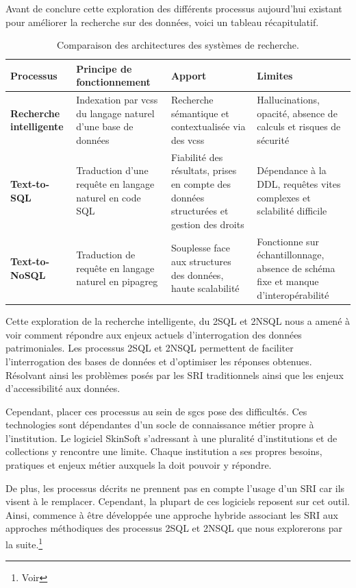Avant de conclure cette exploration des différents processus aujourd'hui existant pour améliorer la recherche sur des données, voici un tableau récapitulatif.

\begin{table}[H]
\centering
\small
\begin{tabularx}{\textwidth}{>{\bfseries}l X X X}
\toprule
Processus & Principe de fonctionnement & Apport & Limites \\
\midrule
Recherche intelligente & Indexation par \glspl{vcs} du langage naturel d'une base de données & Recherche sémantique et contextualisée via des \glspl{vcs} & Hallucinations, opacité, absence de calculs et risques de sécurité \\
\addlinespace[1cm]
Text-to-SQL & Traduction d'une requête en langage naturel en code SQL & Fiabilité des résultats, prises en compte des données structurées et gestion des droits & Dépendance à la \gls{DDL}, requêtes vites complexes et sclabilité difficile\\
\addlinespace[1cm]
Text-to-NoSQL & Traduction de requête en langage naturel en \gls{pipagreg} & Souplesse face aux structures des données, haute scalabilité & Fonctionne sur échantillonnage, absence de schéma fixe et manque d'interopérabilité\\
\bottomrule
\end{tabularx}
\caption{Comparaison des architectures des systèmes de recherche.}
\label{tab:pipelines_recherche}
\end{table}

Cette exploration de la recherche intelligente, du \gls{2SQL} et \gls{2NSQL} nous a amené à voir comment répondre aux enjeux actuels d'interrogation des données patrimoniales. Les processus \gls{2SQL} et \gls{2NSQL} permettent de faciliter l'interrogation des bases de données et d'optimiser les réponses obtenues. Résolvant ainsi les problèmes posés par les \gls{SRI} traditionnels ainsi que les enjeux d'accessibilité aux données.\newline

\label{hybride} Cependant, placer ces processus au sein de \glspl{sgc} pose des difficultés. Ces technologies sont dépendantes d'un socle de connaissance métier propre à l'institution. Le logiciel SkinSoft s'adressant à une pluralité d'institutions et de collections y rencontre une limite. Chaque institution a ses propres besoins, pratiques et enjeux métier auxquels la  doit pouvoir y répondre.

De plus, les processus décrits ne prennent pas en compte l'usage d'un \gls{SRI} car ils visent à le remplacer. Cependant, la plupart de ces logiciels reposent sur cet outil. Ainsi, commence à être développée une approche hybride associant les \gls{SRI} aux approches méthodiques des processus \gls{2SQL} et \gls{2NSQL} que nous explorerons par la suite.\footnote{Voir }

